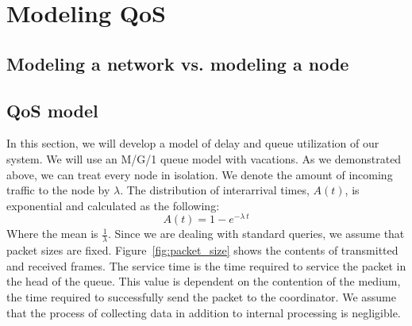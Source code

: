 \documentclass[10pt, conference]{IEEEtran}
\begin{document}
\section{Modeling QoS}\label{sec:model}

\subsection{Modeling a network vs. modeling a node}

\subsection{QoS model}
In this section, we will develop a model of delay and queue utilization of our system. We will use an M/G/1 queue model with vacations. As we demonstrated above, we can treat every node in isolation. We denote the amount of incoming traffic to the node by $\lambda$. The distribution of interarrival times, $A(t)$, is exponential and calculated as the following:
\begin{equation}
A(t) = 1 - e^{-\lambda\ t}
\end{equation}
Where the mean is $\frac{1}{\lambda}$. Since we are dealing with standard queries, we assume that packet sizes are fixed. Figure~\ref{fig:packet_size} shows the contents of transmitted and received frames. The service time is the time required to service the packet in the head of the queue. 
This value is dependent on the contention of the medium, the time required to successfully send the packet to the coordinator. We assume that the process of collecting data in addition to internal processing is negligible.
\end{document}
